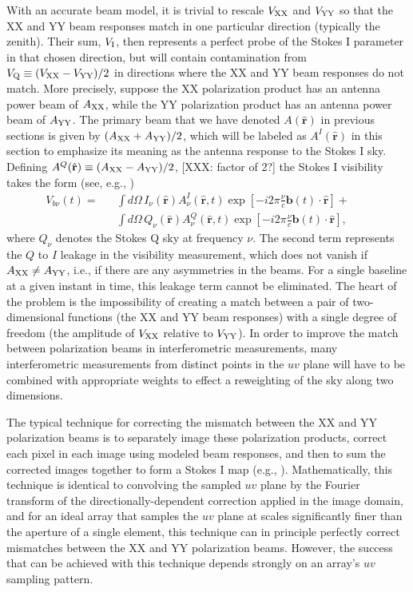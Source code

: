 \documentclass[twocolumn,apj,numberedappendix]{emulateapj}
\newcommand{\rhat}{\hat{\mathbf{r}}}
\begin{document}
With an accurate beam model, it is trivial to rescale ${V_{\rm XX}}$ and ${V_{\rm YY}}$ 
so that the XX and YY beam responses match in one particular direction (typically the zenith).  Their sum, ${V_{\rm I}}$, then
represents a perfect probe of the Stokes I parameter in that chosen direction, but will contain contamination
from ${V_{\rm Q}}\equiv({V_{\rm XX}}-{V_{\rm YY}})/2$ in directions where the XX and YY beam responses do not match.
More precisely, suppose the XX polarization product has an antenna power beam of $A_{\rm XX}$, while the YY 
polarization product has an antenna power beam of $A_{\rm YY}$. The primary beam that we have denoted $A(\rhat)$ 
in previous sections is given by $(A_{\rm XX} + A_{\rm YY})/2$, which will be labeled as $A^I(\rhat)$ in this section to emphasize
its meaning as the antenna response to the Stokes I sky. Defining $A^Q(\rhat) \equiv (A_{\rm XX} - A_{\rm YY})/2$, [XXX: factor of 2?] the
Stokes I visibility takes the form (see, e.g., \citealt{moore_et_al2015})
\begin{eqnarray}
V_{b\nu}(t)= &&\int d\Omega \, {I_\nu(\rhat) A^I_\nu(\rhat,t) \exp \left[-i2\pi \frac{\nu}{c}  \mathbf{b}(t) \cdot \rhat\right]} + \nonumber \\
&& \int d\Omega \, {Q_\nu(\rhat) A^Q_\nu(\rhat,t) \exp \left[-i2\pi \frac{\nu}{c}  \mathbf{b}(t) \cdot \rhat\right]}, \qquad
\end{eqnarray}
where $Q_\nu$ denotes the Stokes Q sky at frequency $\nu$. The second term represents the $Q$ to $I$ leakage
in the visibility measurement, which does not vanish if $ A_{\rm XX} \neq A_{\rm YY}$, i.e., if there are
any asymmetries in the beams. For a single baseline at a given instant in time, this leakage term
cannot be eliminated. The heart of the problem is the impossibility of creating a match between a pair of two-dimensional functions (the
XX and YY beam responses) with a single degree of freedom (the amplitude of ${V_{\rm XX}}$ relative to ${V_{\rm YY}}$).  In order
to improve the match between polarization beams in interferometric measurements, many interferometric measurements
from distinct points in the $uv$ plane will have to be combined with appropriate weights to effect a reweighting
of the sky along two dimensions.

The typical technique for correcting the mismatch between the XX and YY polarization beams is to separately
image these polarization products, correct each pixel in each image using modeled beam responses,
and then to sum the corrected images together to form a Stokes I map 
(e.g., \citealt{sullivan_et_al2012,bernardi_et_al2013,asad_et_al2015}).  Mathematically, this technique is identical to convolving the sampled
$uv$ plane by the Fourier transform of the directionally-dependent correction applied in the image domain, and for an ideal
array that samples the $uv$ plane at scales significantly finer than the aperture of a single element, this technique can
in principle perfectly correct mismatches between the XX and YY polarization beams.
However, the success that can be achieved with this technique depends strongly on an array's $uv$ sampling pattern.
\end{document}
